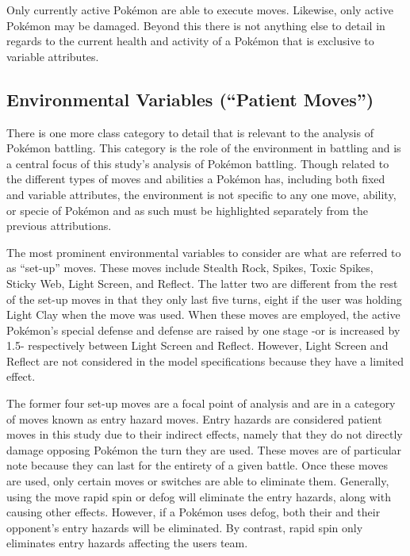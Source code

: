 \documentclass[12pt,twoside]{reedthesis}
\begin{document}
  Only currently active Pokémon are able to execute moves. Likewise, only
  active Pokémon may be damaged. Beyond this there is not anything else to
  detail in regards to the current health and activity of a Pokémon that
  is exclusive to variable attributes.
  
  \subsection{\texorpdfstring{Environmental Variables (``Patient
  Moves'')}{Environmental Variables (Patient Moves)}}\label{environmental-variables-patient-moves}
  
  There is one more class category to detail that is relevant to the
  analysis of Pokémon battling. This category is the role of the
  environment in battling and is a central focus of this study's analysis
  of Pokémon battling. Though related to the different types of moves and
  abilities a Pokémon has, including both fixed and variable attributes,
  the environment is not specific to any one move, ability, or specie of
  Pokémon and as such must be highlighted separately from the previous
  attributions.
  
  The most prominent environmental variables to consider are what are
  referred to as ``set-up'' moves. These moves include Stealth Rock,
  Spikes, Toxic Spikes, Sticky Web, Light Screen, and Reflect. The latter
  two are different from the rest of the set-up moves in that they only
  last five turns, eight if the user was holding Light Clay when the move
  was used. When these moves are employed, the active Pokémon's special
  defense and defense are raised by one stage -or is increased by 1.5-
  respectively between Light Screen and Reflect. However, Light Screen and
  Reflect are not considered in the model specifications because they have
  a limited effect.
  
  The former four set-up moves are a focal point of analysis and are in a
  category of moves known as entry hazard moves. Entry hazards are
  considered patient moves in this study due to their indirect effects,
  namely that they do not directly damage opposing Pokémon the turn they
  are used. These moves are of particular note because they can last for
  the entirety of a given battle. Once these moves are used, only certain
  moves or switches are able to eliminate them. Generally, using the move
  rapid spin or defog will eliminate the entry hazards, along with causing
  other effects. However, if a Pokémon uses defog, both their and their
  opponent's entry hazards will be eliminated. By contrast, rapid spin
  only eliminates entry hazards affecting the users team.
  
\end{document}
